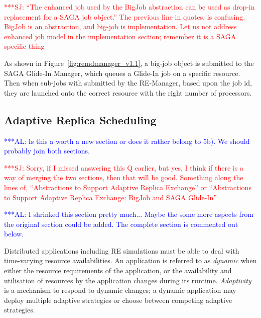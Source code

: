 \documentclass{rspublic}
\newcommand{\alnote}[1]{ {\textcolor{blue} { ***AL: #1 }}}
\newcommand{\jhanote}[1]{ {\textcolor{red} { ***SJ: #1 }}}
\newcommand{\alnote}[1]{}
\newcommand{\jhanote}[1]{}
\begin{document}
\jhanote{``The enhanced job used by the BigJob abstraction can be used
  as drop-in replacement for a SAGA job object.'' The previous line in
  quotes, is confusing. BigJob is an abstraction, and big-job is
  implementation. Let us not address enhanced job model in the
  implementation section; remember it is a SAGA specific thing}

As shown in Figure~\ref{fig:remdmanager_v1.1}, a big-job object is
submitted to the SAGA Glide-In Manager, which queues a Glide-In job on
a specific resource. Then when sub-jobs with submitted by the
RE-Manager, based upon the job id, they are launched onto the correct
resource with the right number of processors.


\subsection{Adaptive Replica Scheduling}
\label{sec:adaptivitiy}    
\alnote{Is this a worth a new section or does it rather belong to
  5b). We should probably join both sections.}  

\jhanote{Sorry, if I missed answering this Q earlier, but yes, I think
  if there is a way of merging the two sections, then that will be
  good. Something along the lines of, ``Abstractions to Support
  Adaptive Replica Exchange'' or ``Abstractions to Support Adaptive
  Replica Exchange: BigJob and SAGA Glide-In''}

\alnote{I shrinked this section pretty much... Maybe the some more
    aspects from the original section could be added. The complete
    section is commented out below.}

Distributed applications including RE simulations must be able to 
deal with time-varying resource availabilities.
An application is referred to as \emph{dynamic} when either the
resource requirements of the application, or the availability and
utilisation of resources by the application changes during its
runtime.  \emph{Adaptivity} is a mechanism to respond to dynamic
changes; %
a dynamic application may deploy multiple adaptive strategies or
choose between competing adaptive strategies.
\end{document}
